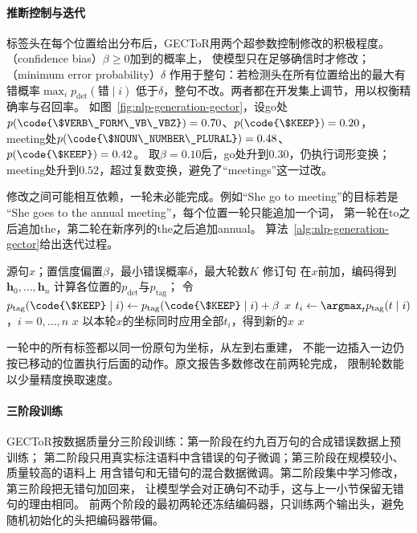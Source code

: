 \paragraph{推断控制与迭代}
标签头在每个位置给出分布后，GECToR用两个超参数控制修改的积极程度。
（confidence bias）$\beta\geq0$加到的概率上，
使模型只在足够确信时才修改；（minimum error probability）$\delta$
作用于整句：若检测头在所有位置给出的最大有错概率$\max_i p_{\mathrm{det}}(\text{错}\mid i)$
低于$\delta$，整句不改。两者都在开发集上调节，用以权衡精确率与召回率。
如图~\ref{fig:nlp-generation-gector}，设go处
$p(\code{\$VERB\_FORM\_VB\_VBZ})=0.70$、$p(\code{\$KEEP})=0.20$，
meeting处$p(\code{\$NOUN\_NUMBER\_PLURAL})=0.48$、$p(\code{\$KEEP})=0.42$。
取$\beta=0.10$后，go处升到$0.30$，仍执行词形变换；
meeting处升到$0.52$，超过复数变换，避免了“meetings”这一过改。

修改之间可能相互依赖，一轮未必能完成。例如“She go to meeting”的目标若是
“She goes to the annual meeting”，每个位置一轮只能追加一个词，
第一轮在to之后追加the，第二轮在新序列的the之后追加annual。
算法~\ref{alg:nlp-generation-gector}给出迭代过程。

\begin{algorithm}[GECToR的迭代纠错]
  \label{alg:nlp-generation-gector}
  \begin{algorithmic}[1]
    \Require 源句$x$；置信度偏置$\beta$，最小错误概率$\delta$，最大轮数$K$
    \Ensure 修订句
      \State 在$x$前加，编码得到$\bm h_0,\ldots,\bm h_n$
      \State 计算各位置的$p_{\mathrm{det}}$与$p_{\mathrm{tag}}$；
        令$p_{\mathrm{tag}}(\code{\$KEEP}\mid i)\gets p_{\mathrm{tag}}(\code{\$KEEP}\mid i)+\beta$
        \State \Return $x$
      \EndIf
      \State $t_i\gets\argmax_t p_{\mathrm{tag}}(t\mid i)$，$i=0,\ldots,n$
        \State \Return $x$
      \EndIf
      \State 以本轮$x$的坐标同时应用全部$t_i$，得到新的$x$
    \EndFor
    \State \Return $x$
  \end{algorithmic}
\end{algorithm}

一轮中的所有标签都以同一份原句为坐标，从左到右重建，
不能一边插入一边仍按已移动的位置执行后面的动作。原文报告多数修改在前两轮完成，
限制轮数能以少量精度换取速度。

\paragraph{三阶段训练}
GECToR按数据质量分三阶段训练：第一阶段在约九百万句的合成错误数据上预训练；
第二阶段只用真实标注语料中含错误的句子微调；第三阶段在规模较小、质量较高的语料上
用含错句和无错句的混合数据微调。第二阶段集中学习修改，第三阶段把无错句加回来，
让模型学会对正确句不动手，这与上一小节保留无错句的理由相同。
前两个阶段的最初两轮还冻结编码器，只训练两个输出头，避免随机初始化的头把编码器带偏。

